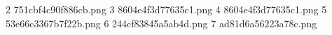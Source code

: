 2 751cbf4c90f886cb.png
3 8604e4f3d77635c1.png
4 8604e4f3d77635c1.png
5 53e66c3367b7f22b.png
6 244cf83845a5ab4d.png
7 ad81d6a56223a78c.png
